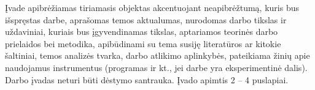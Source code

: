 Įvade apibrėžiamas tiriamasis objektas akcentuojant neapibrėžtumą, kuris
bus išspręstas darbe, aprašomas temos aktualumas, nurodomas darbo tikslas
ir uždaviniai, kuriais bus įgyvendinamas tikslas, aptariamos teorinės darbo prielaidos
bei metodika, apibūdinami su tema susiję literatūros ar kitokie šaltiniai,
temos analizės tvarka, darbo atlikimo aplinkybės, pateikiama žinių apie
naudojamus instrumentus (programas ir kt., jei darbe yra eksperimentinė dalis).
Darbo įvadas neturi būti dėstymo santrauka. Įvado apimtis 2 -- 4 puslapiai.